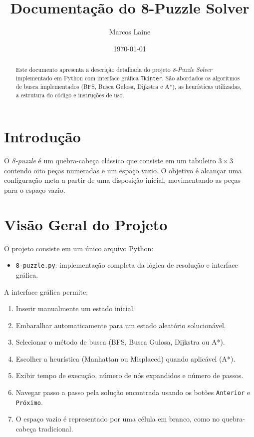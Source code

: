 \documentclass[12pt]{article}
\title{Documentação do 8-Puzzle Solver}
\author{Marcos Laine}
\date{\today}
\begin{document}
\maketitle

\begin{abstract}
Este documento apresenta a descrição detalhada do projeto \textit{8-Puzzle Solver} implementado em Python com interface gráfica \texttt{Tkinter}. São abordados os algoritmos de busca implementados (BFS, Busca Gulosa, Dijkstra e A*), as heurísticas utilizadas, a estrutura do código e instruções de uso.
\end{abstract}

\section{Introdução}
O \textit{8-puzzle} é um quebra-cabeça clássico que consiste em um tabuleiro $3\times3$ contendo oito peças numeradas e um espaço vazio. O objetivo é alcançar uma configuração meta a partir de uma disposição inicial, movimentando as peças para o espaço vazio.

\section{Visão Geral do Projeto}
O projeto consiste em um único arquivo Python:
\begin{itemize}
  \item \texttt{8-puzzle.py}: implementação completa da lógica de resolução e interface gráfica.
\end{itemize}

A interface gráfica permite:
\begin{enumerate}
  \item Inserir manualmente um estado inicial.
  \item Embaralhar automaticamente para um estado aleatório solucionável.
  \item Selecionar o método de busca (BFS, Busca Gulosa, Dijkstra ou A*).
  \item Escolher a heurística (Manhattan ou Misplaced) quando aplicável (A*).
  \item Exibir tempo de execução, número de nós expandidos e número de passos.
  \item Navegar passo a passo pela solução encontrada usando os botões \texttt{Anterior} e \texttt{Próximo}.
  \item O espaço vazio é representado por uma célula em branco, como no quebra-cabeça tradicional.
\end{enumerate}
\end{document}
